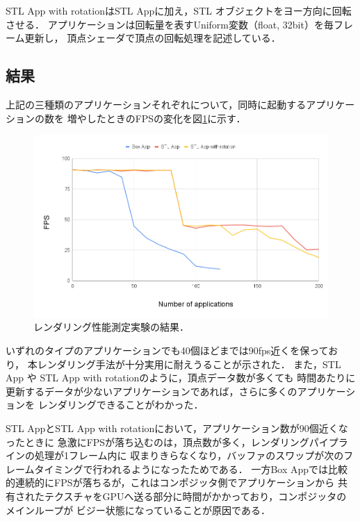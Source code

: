 STL App with rotationはSTL Appに加え，STL オブジェクトをヨー方向に回転させる．
アプリケーションは回転量を表すUniform変数（float, 32bit）を毎フレーム更新し，
頂点シェーダで頂点の回転処理を記述している．

\subsection{結果}

上記の三種類のアプリケーションそれぞれについて，同時に起動するアプリケーションの数を
増やしたときのFPSの変化を図\ref{fig:rendering-fps}に示す．

\begin{figure}[htbp]
  \centering
  \includegraphics[keepaspectratio, width=\linewidth]{figures/rendering-fps.png}
  \caption{
    レンダリング性能測定実験の結果．
  }
  \label{fig:rendering-fps}
\end{figure}

いずれのタイプのアプリケーションでも40個ほどまでは90fps近くを保っており，
本レンダリング手法が十分実用に耐えうることが示された．
また，STL App や STL App with rotationのように，頂点データ数が多くても
時間あたりに更新するデータが少ないアプリケーションであれば，さらに多くのアプリケーションを
レンダリングできることがわかった．

STL AppとSTL App with rotationにおいて，アプリケーション数が90個近くなったときに
急激にFPSが落ち込むのは，頂点数が多く，レンダリングパイプラインの処理が1フレーム内に
収まりきらなくなり，バッファのスワップが次のフレームタイミングで行われるようになったためである．
一方Box Appでは比較的連続的にFPSが落ちるが，これはコンポジッタ側でアプリケーションから
共有されたテクスチャをGPUへ送る部分に時間がかかっており，コンポジッタのメインループが
ビジー状態になっていることが原因である．

